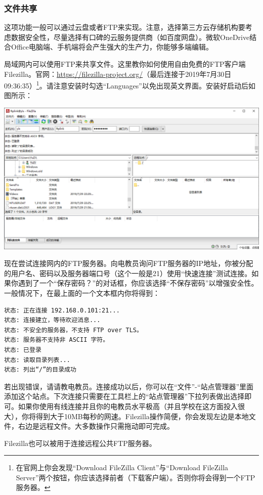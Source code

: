 \subsubsection{文件共享}
这项功能一般可以通过云盘或者FTP来实现。注意，选择第三方云存储机构要考虑数据安全性，尽量选择有口碑的云服务提供商（如百度网盘）。微软OneDrive结合Office电脑端、手机端将会产生强大的生产力，你能够多端编辑。\par
局域网内可以使用FTP来共享文件。这里教你如何使用自由免费的FTP客户端Filezilla。官网：\url{https://filezilla-project.org/}（最后连接于2019年7月30日09:36:35）\footnote{在官网上你会发现“Download FileZilla Client”与“Download FileZilla Server”两个按钮，你应该选择前者（下载客户端）。否则你将会得到一个FTP服务器。}。请注意安装时勾选“Languages”以免出现英文界面。安装好启动后如图所示：\par
\begin{center}
	\includegraphics[scale=0.5]{pic/fz}
\end{center} \par
现在尝试连接网内的FTP服务器。向电教员询问FTP服务器的IP地址，你被分配的用户名、密码以及服务器端口号（这个一般是21）使用“快速连接”测试连接。如果你遇到了一个“保存密码？”的对话框，你应该选择“不保存密码”以增强安全性。一般情况下，在最上面的一个文本框内你将得到：
\begin{verbatim}
状态:	正在连接 192.168.0.101:21...
状态:	连接建立，等待欢迎消息...
状态:	不安全的服务器，不支持 FTP over TLS。
状态:	服务器不支持非 ASCII 字符。
状态:	已登录
状态:	读取目录列表...
状态:	列出“/”的目录成功
\end{verbatim}
若出现错误，请请教电教员。连接成功以后，你可以在“文件”-“站点管理器”里面添加这个站点。下次连接只需要在工具栏上的“站点管理器”下拉列表做出选择即可。如果你使用有线连接并且你的电教员水平极高（并且学校在这方面投入很大），你将得到大于10MB每秒的网速。Filezilla操作简便，你会发现左边是本地文件，右边是远程文件。大多数操作只需拖动即可完成。\par
Filezilla也可以被用于连接远程公共FTP服务器。
